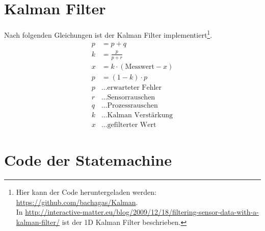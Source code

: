 \documentclass[.\jobname.tex]{subfiles}
\begin{document}
\chapter{Kalman Filter}\label{sec:kalmann implementation}
%
Nach folgenden Gleichungen ist der Kalman Filter implementiert\footnote{Hier kann der Code heruntergeladen werden: \url{https://github.com/bachagas/Kalman}.\\
In \url{http://interactive-matter.eu/blog/2009/12/18/filtering-sensor-data-with-a-kalman-filter/} ist der 1D Kalman Filter beschrieben.}.
%
\begin{align}
p &= p +q\\
k &= \frac{p}{p+r}\\
x &= k \cdot \left(\text{Messwert} - x\right)\\
p &= \left(1-k\right)\cdot p\\
p&\ldots \text{erwarteter Fehler}\\
r &\ldots \text{Sensorrauschen}\\
q &\ldots \text{Prozessrauschen}\\
k &\ldots \text{Kalman Verstärkung}\\
x &\ldots \text{gefilterter Wert}
\end{align}
%
\chapter{Code der Statemachine}\label{sec: code statemachin}
%
%

%
\end{document}
